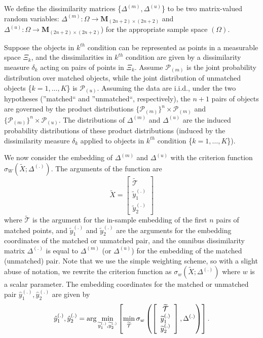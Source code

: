 \documentclass[12pt,oneside,final]{thesis}
\begin{document}
We define the dissimilarity matrices \{$\Delta^{(m)},\Delta^{(u)}$\} to be  two matrix-valued random variables: $\Delta^{(m)}:\Omega \rightarrow \mathbf{M}_{(2n+2)\times (2n+2)} $ and  $\Delta^{(u)}:\Omega \rightarrow \mathbf{M}_{(2n+2)\times (2n+2)} $) for the appropriate sample  space $(\Omega)$.
\begin{remark}
Suppose the objects in $k^{th}$  condition  can be represented as points in a measurable space $\Xi_k$, and the dissimilarities in $k^{th}$ condition are given by  a dissimilarity measure $\delta_k$ acting on pairs of points in $\Xi_k$. Assume $\mathcal{P}_{(m)}$ is the joint probability distribution over matched objects, while the joint distribution of unmatched objects \{$k=1,\ldots,K$\}  is $\mathcal{P}_{(u)}$. Assuming the data are i.i.d., under the two hypotheses (''matched`` and ''unmatched``, respectively), the $n+1$ pairs of objects are governed  by the product distributions $\{\mathcal{P}_{(m)}\}^n \times \mathcal{P}_{(m)} $ and $\{\mathcal{P}_{(m)}\}^n \times \mathcal{P}_{(u)} $.  The distributions of $\Delta^{(m)}$ and $\Delta^{(u)}$ are the induced probability distributions of  these product distributions (induced by the  dissimilarity measure $\delta_k$ applied to  objects in $k^{th}$ condition \{$k=1,\ldots,K$\}).
\end{remark}




 We now consider the embedding of $\Delta^{(m)}$ and $\Delta^{(u)}$ with the criterion function  $\sigma_W(\widetilde{X}; \Delta^{(.)})$. The arguments of the function are  $$\widetilde{X}= \left[
\begin{array}{c}
{\widetilde{\mathcal{T}}} \\
\widetilde{y}_{1}^{(.)} \\
\widetilde{y}_{2}^{(.)}
\end {array}
\right]$$ where ${\widetilde{\mathcal{T}}}$ is the argument for the in-sample embedding of the first $n$ pairs of matched points, and
 $\widetilde{y}_{1}^{(.)} $ and $\widetilde{y}_{2}^{(.)} $ are the arguments for the embedding coordinates of the matched  or unmatched pair,
and the omnibus dissimilarity matrix $\Delta^{(.)}$ is equal to  $\Delta^{(m)}$  (or $\Delta^{(u)}$) for the embedding of the  matched (unmatched) pair. Note that we use the simple weighting scheme, so with a slight abuse of notation, we rewrite the criterion function as  $\sigma_w(\widetilde{X}; \Delta^{(.)})$ where $w$ is a scalar parameter.
The embedding coordinates for the matched or unmatched pair  ${\hat{y}_{1}^{(.)},\hat{y}_{2}^{(.)}}$ are given by
 \[
{\hat{y}_{1}^{(.)},\hat{y}_{2}^{(.)}}
=\arg\min_{\widetilde{y}_{1}^{(.)}, \widetilde{y}_{2}^{(.)}}\left[\min_{\widetilde{\mathcal{T}}}
{\sigma_w\left(
\left[
\begin{array}{c}
{\widetilde{\mathcal{T}}} \\
\widetilde{y}_{1}^{(.)} \\
\widetilde{y}_{2}^{(.)}
\end {array}
\right]
,
\Delta^{(.)}
\right)
}
\right]. \label{oos-embedding}
\]
\end{document}
